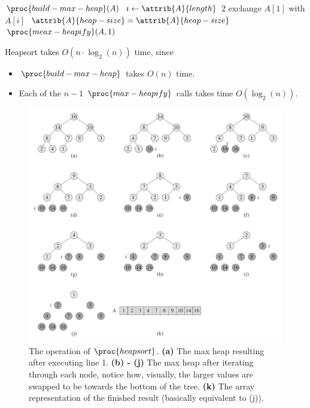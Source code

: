 \documentclass{article}
\begin{document}
\begin{codebox}
\li $\proc{build-max-heap}(A)$
\li \For $i \gets \attrib{A}{length}$ \Downto $2$
\li \Do
        exchange $A[1]$ with $A[i]$
\li     $\attrib{A}{heap-size} = \attrib{A}{heap-size}$
\li     $\proc{meax-heapify}(A, 1)$
    \End
\end{codebox}

Heapsort takes $O(n \cdot \log_2(n))$ time, since
\begin{itemize}
    \item $\proc{build-max-heap}$ takes $O(n)$ time.
    \item Each of the $n-1$ $\proc{max-heapify}$ calls takes time $O(\log_2(n))$.
\end{itemize}

\newpage

\begin{figure}[!ht]
\centering
\includegraphics[scale=0.65]{heapsort}
\caption{
  The operation of $\proc{heapsort}$. \textbf{(a)} The max heap resulting after executing line 1. \textbf{(b) - (j)} The max heap after iterating through each node, notice how, visually, the larger values are swapped to be towards the bottom of the tree. \textbf{(k)} The array representation of the finished result (basically equivalent to (j)).
}
\label{fig:heapsort}
\end{figure}
\end{document}
